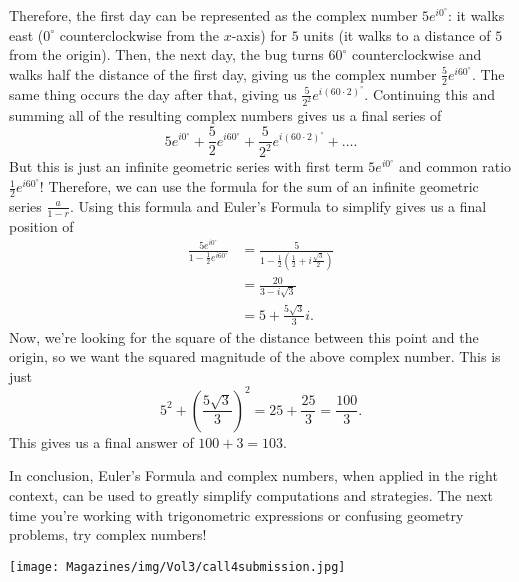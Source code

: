 \documentclass{article}
\begin{document}
\begin{multicols}{3}
Therefore, the first day can be represented as the complex number $5e^{i0^\circ}$: it walks east ($0^\circ$ counterclockwise from the $x$-axis) for $5$ units (it walks to a distance of $5$ from the origin). Then, the next day, the bug turns $60^\circ$ counterclockwise and walks half the distance of the first day, giving us the complex number $\frac{5}{2}e^{i60^\circ}$. The same thing occurs the day after that, giving us $\frac{5}{2^2}e^{i(60\cdot2)^\circ}$. Continuing this and summing all of the resulting complex numbers gives us a final series of
\[5e^{i0^\circ}+\frac{5}{2}e^{i60^\circ}+\frac{5}{2^2}e^{i(60\cdot2)^\circ}+\dots.\]
But this is just an infinite geometric series with first term $5e^{i0^\circ}$ and common ratio $\frac{1}{2}e^{i60^\circ}$! Therefore, we can use the formula for the sum of an infinite geometric series $\frac{a}{1-r}$. Using this formula and Euler's Formula to simplify gives us a final position of
\begin{align*}
\frac{5e^{i0^\circ}}{1-\frac{1}{2}e^{i60^\circ}}&=\frac{5}{1-\frac{1}{2}\left(\frac{1}{2}+i\frac{\sqrt{3}}{2}\right)} \\
&=\frac{20}{3-i\sqrt{3}} \\
&=5+\frac{5\sqrt{3}}{3}i.
\end{align*}
Now, we're looking for the square of the distance between this point and the origin, so we want the squared magnitude of the above complex number. This is just
\[5^2+\left(\frac{5\sqrt{3}}{3}\right)^2=25+\frac{25}{3}=\frac{100}{3}.\]
This gives us a final answer of $100+3=\boxed{103}$.

In conclusion, Euler's Formula and complex numbers, when applied in the right context, can be used to greatly simplify computations and strategies. The next time you're working with trigonometric expressions or confusing geometry problems, try complex numbers!
\closearticle

\end{multicols}

\clearpage
\begin{center}
\vspace{1.5cm}
    \texttt{[image: Magazines/img/Vol3/call4submission.jpg]}
\end{center}

\vspace{1.5cm}
\end{document}
